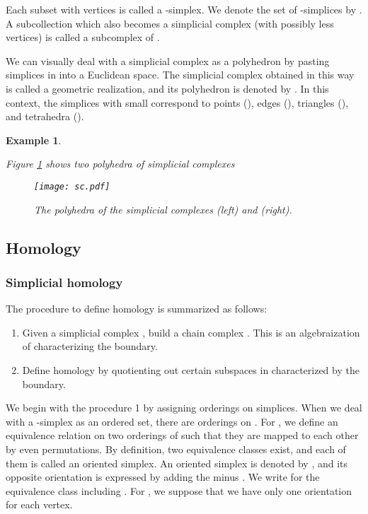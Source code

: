 \documentclass{article}
\newtheorem{exam}[thm]{Example}
\begin{document}
Each subset  with  vertices is called a -simplex.
We denote the set of -simplices by .
A subcollection  which also becomes a simplicial complex (with possibly less vertices) is called a subcomplex of .

We can visually deal with a simplicial complex  as a polyhedron by pasting simplices in  into a Euclidean space.
The simplicial complex obtained in this way is called a geometric realization, and its polyhedron is denoted by . 
In this context, the simplices with small  correspond to points (), edges (), triangles (), and tetrahedra (). 
\begin{exam}\label{exam:sc}
{\rm 
Figure \ref{fig:sc} shows two polyhedra of simplicial complexes


\begin{figure}[htbp]
\begin{center}
\texttt{[image: sc.pdf]}
\end{center}
\caption{The polyhedra of the simplicial complexes  (left) and  (right).}
\label{fig:sc}
\end{figure}
}\end{exam}



\subsection{Homology}\label{sec:homology}
\subsubsection{Simplicial homology}\label{sec:simplicial_homology}
The procedure to define homology is summarized as follows:
\begin{enumerate}
\item Given a simplicial complex , build a chain complex  . This is an algebraization of  characterizing the boundary. 
\item Define homology by quotienting out  certain subspaces in  characterized by the boundary. 
\end{enumerate}

We begin with the procedure 1 by assigning orderings on simplices. 
When we deal with a -simplex  as an ordered set, there are  orderings on .
For , we define an equivalence relation  on two orderings of  such that they are mapped to each other by even permutations. 
By definition, two equivalence classes exist, and each of them is called an oriented simplex. 
An oriented simplex is denoted by , and its opposite orientation is expressed by adding the minus .
We write  for the equivalence class including . For , we suppose that we have only one orientation for each vertex. 
\end{document}
